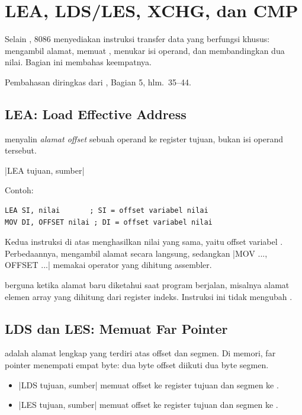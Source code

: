 \section{LEA, LDS/LES, XCHG, dan CMP}
\label{sec:lea-lds-xchg-cmp}

Selain , 8086 menyediakan instruksi transfer data yang
berfungsi khusus: mengambil alamat, memuat ,
menukar isi operand, dan membandingkan dua nilai. Bagian ini
membahas keempatnya.

Pembahasan diringkas dari \cite{gunawan2019}, Bagian 5,
hlm.~35--44.

\subsection{LEA: Load Effective Address}

 menyalin \emph{alamat offset} sebuah operand ke register
tujuan, bukan isi operand tersebut.

\begin{center}
\lstasm|LEA tujuan, sumber|
\end{center}

Contoh:

\begin{lstlisting}[language=MASM, numbers=none]
LEA SI, nilai       ; SI = offset variabel nilai
MOV DI, OFFSET nilai ; DI = offset variabel nilai
\end{lstlisting}

Kedua instruksi di atas menghasilkan nilai yang sama, yaitu offset
variabel . Perbedaannya,  mengambil alamat
secara langsung, sedangkan \lstasm|MOV ..., OFFSET ...| memakai
operator  yang dihitung assembler.

 berguna ketika alamat baru diketahui saat program
berjalan, misalnya alamat elemen array yang dihitung dari register
indeks. Instruksi ini tidak mengubah .

\subsection{LDS dan LES: Memuat Far Pointer}

 adalah alamat lengkap yang terdiri atas offset dan
segmen. Di memori, far pointer menempati empat byte: dua byte offset
diikuti dua byte segmen.

\begin{itemize}
    \item \lstasm|LDS tujuan, sumber| memuat offset ke register
          tujuan dan segmen ke .
    \item \lstasm|LES tujuan, sumber| memuat offset ke register
          tujuan dan segmen ke .
\end{itemize}

